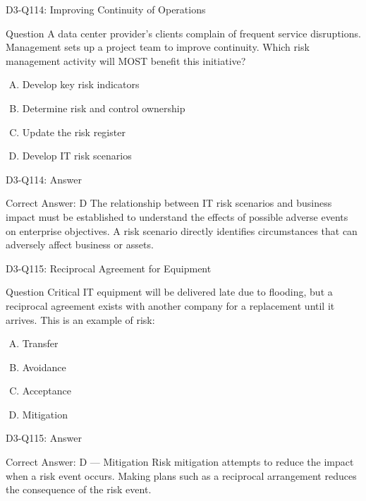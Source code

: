 \documentclass{beamer}
\begin{document}
	\begin{frame}{D3-Q114: Improving Continuity of Operations}
		\begin{block}{Question}
			A data center provider's clients complain of frequent service disruptions. Management sets up a project team to improve continuity. Which risk management activity will MOST benefit this initiative?
		\end{block}
		\begin{enumerate}[(A)]
			\item Develop key risk indicators
			\item Determine risk and control ownership
			\item Update the risk register
			\item Develop IT risk scenarios
		\end{enumerate}
	\end{frame}
	\begin{frame}{D3-Q114: Answer}
		\begin{block}{Correct Answer: D}
			The relationship between IT risk scenarios and business impact must be established to understand the effects of possible adverse events on enterprise objectives. A risk scenario directly identifies circumstances that can adversely affect business or assets.
		\end{block}
	\end{frame}
	
	\begin{frame}{D3-Q115: Reciprocal Agreement for Equipment}
		\begin{block}{Question}
			Critical IT equipment will be delivered late due to flooding, but a reciprocal agreement exists with another company for a replacement until it arrives. This is an example of risk:
		\end{block}
		\begin{enumerate}[(A)]
			\item Transfer
			\item Avoidance
			\item Acceptance
			\item Mitigation
		\end{enumerate}
	\end{frame}
	\begin{frame}{D3-Q115: Answer}
		\begin{block}{Correct Answer: D --- Mitigation}
			Risk mitigation attempts to reduce the impact when a risk event occurs. Making plans such as a reciprocal arrangement reduces the consequence of the risk event.
		\end{block}
	\end{frame}
	
\end{document}
